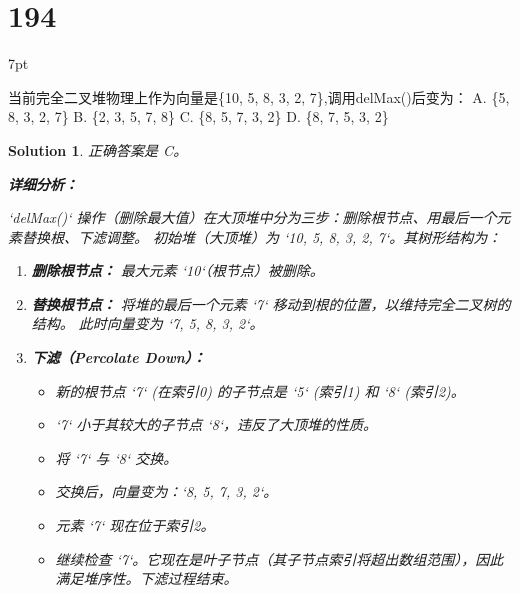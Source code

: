 \documentclass[UTF8]{report}
\newtheorem{solution}{Solution}
\theoremstyle{MyLineTheoremStyle} %
\theoremstyle{MyBlockTheoremStyle} %
\theoremstyle{MySubsubsectionStyle} %
\newenvironment{graybox}{%
        \def\FrameCommand{%
        \hspace{1pt}%
        {\color{gray}\small \vrule width 2pt}%
        {\color{graybox_color}\vrule width 4pt}%
        \colorbox{graybox_color}%
        }%
        \MakeFramed{\advance\hsize-\width\FrameRestore}%
        \noindent\hspace{-4.55pt}%
        \begin{adjustwidth}{}{7pt}%
        \vspace{2pt}\vspace{2pt}%
        }
        {%
        \vspace{2pt}\end{adjustwidth}\endMakeFramed%
        }
\begin{document}
\section*{194}
\begin{graybox}
当前完全二叉堆物理上作为向量是\{10,
5, 8, 3, 2, 7\},调用delMax()后变为：
A. \{5, 8, 3, 2, 7\}
B. \{2, 3, 5, 7, 8\}
C. \{8, 5, 7, 3, 2\}
D. \{8, 7, 5, 3, 2\}
\end{graybox}

\begin{solution}
正确答案是 C。

\textbf{详细分析：}

`delMax()` 操作（删除最大值）在大顶堆中分为三步：删除根节点、用最后一个元素替换根、下滤调整。
初始堆（大顶堆）为 `{10, 5, 8, 3, 2, 7}`。其树形结构为：
\begin{center}
\end{center}

\begin{enumerate}
    \item \textbf{删除根节点：}
    最大元素 `10`（根节点）被删除。

    \item \textbf{替换根节点：}
    将堆的最后一个元素 `7` 移动到根的位置，以维持完全二叉树的结构。
    此时向量变为 `{7, 5, 8, 3, 2}`。

    \item \textbf{下滤（Percolate Down）：}
    \begin{itemize}
        \item 新的根节点 `7` (在索引0) 的子节点是 `5` (索引1) 和 `8` (索引2)。
        \item `7` 小于其较大的子节点 `8`，违反了大顶堆的性质。
        \item 将 `7` 与 `8` 交换。
        \item 交换后，向量变为：`{8, 5, 7, 3, 2}`。
        \item 元素 `7` 现在位于索引2。
    \end{itemize}
    \begin{itemize}
        \item 继续检查 `7`。它现在是叶子节点（其子节点索引将超出数组范围），因此满足堆序性。下滤过程结束。
    \end{itemize}
\end{enumerate}


\end{solution}
\end{document}
